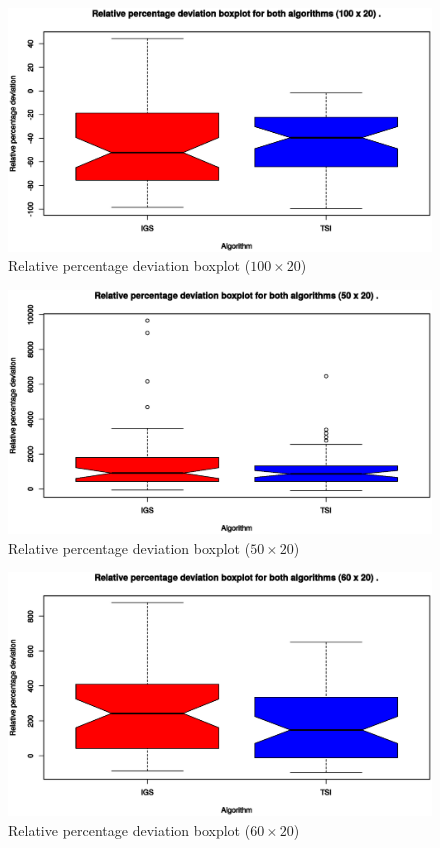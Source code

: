 

\begin{figure}[H]
	\centering
	\includegraphics[width=\textwidth]{fig/box/100x20}
	\caption{Relative percentage deviation boxplot ($100 \times 20$)}
\end{figure}

\begin{figure}[H]
	\centering
	\includegraphics[width=\textwidth]{fig/box/50x20}
	\caption{Relative percentage deviation boxplot ($50 \times 20$)}
\end{figure}

\begin{figure}[H]
	\centering
	\includegraphics[width=\textwidth]{fig/box/60x20}
	\caption{Relative percentage deviation boxplot ($60 \times 20$)}
\end{figure}

